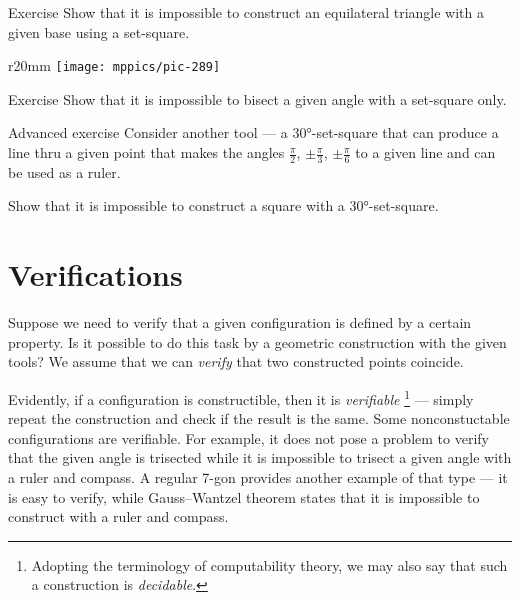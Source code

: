 \begin{thm}{Exercise}\label{ex:equilateral triangle}
Show that it is impossible to construct an equilateral triangle with a given base using
a set-square.
\end{thm}

{

\begin{wrapfigure}{r}{20mm}
\vskip-8mm
\centering
\texttt{[image: mppics/pic-289]}
\end{wrapfigure}


\begin{thm}{Exercise}\label{ex:set-square-bisect}
Show that it is impossible to bisect a given angle with a set-square only.
\end{thm}

\begin{thm}{Advanced exercise}\label{ex:90-60-30}
Consider another tool --- a 30°-set-square that can produce a line thru a given point
that makes the angles
$\tfrac\pi2$, $\pm\tfrac\pi3$, $\pm\tfrac\pi6$
to a given line and can be used as a ruler.

{Show that it is impossible to construct a square with a 30°-set-square.}
\end{thm}

}

\section{Verifications}
\label{sec:verification}

Suppose we need to verify that a given configuration is defined by a certain property. 
Is it possible to do this task by a geometric construction with the given tools?
We assume that we can \emph{verify} that two constructed points coincide.

Evidently, if a configuration is constructible, then it is \emph{verifiable}%
\footnote{Adopting the terminology of computability theory, we may also say that such a construction is \emph{decidable}.} --- simply repeat the construction and check if the result is the same.
Some nonconstuctable configurations are verifiable.
For example, it does not pose a problem to verify that the given angle is trisected while it is impossible to trisect a given angle with a ruler and compass.
A regular 7-gon provides another example of that type --- it is easy to verify, while Gauss--Wantzel theorem states that it is impossible to construct with a ruler and compass.

